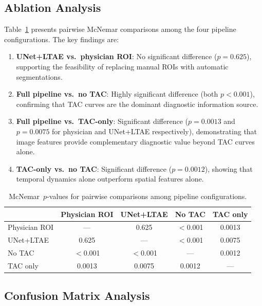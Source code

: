 \documentclass[sn-basic]{sn-jnl}
\begin{document}
\subsection{Ablation Analysis}

Table~\ref{tab:mcnemar} presents pairwise McNemar comparisons
among the four pipeline configurations.  The key findings
are:

\begin{enumerate}
  \item \textbf{UNet+LTAE vs.\ physician ROI}: No significant
    difference ($p=0.625$), supporting the feasibility of
    replacing manual ROIs with automatic segmentations.
  \item \textbf{Full pipeline vs.\ no TAC}: Highly significant
    difference (both $p<0.001$), confirming that TAC curves
    are the dominant diagnostic information source.
  \item \textbf{Full pipeline vs.\ TAC-only}: Significant
    difference ($p=0.0013$ and $p=0.0075$ for physician and
    UNet+LTAE respectively), demonstrating that image
    features provide complementary diagnostic value beyond
    TAC curves alone.
  \item \textbf{TAC-only vs.\ no TAC}: Significant difference
    ($p=0.0012$), showing that temporal dynamics alone
    outperform spatial features alone.
\end{enumerate}

\begin{table}[t]
  \centering
  \caption{McNemar~$p$-values for pairwise comparisons among
    pipeline configurations.}
  \label{tab:mcnemar}
  \small
  \begin{threeparttable}
    \begin{tabular}{lcccc}
      \toprule
      & Physician ROI & UNet+LTAE & No TAC & TAC only \\
      \midrule
      Physician ROI & --- & 0.625 & $<$0.001 & 0.0013 \\
      UNet+LTAE & 0.625 & --- & $<$0.001 & 0.0075 \\
      No TAC & $<$0.001 & $<$0.001 & --- & 0.0012 \\
      TAC only & 0.0013 & 0.0075 & 0.0012 & --- \\
      \bottomrule
    \end{tabular}
  \end{threeparttable}
\end{table}

\subsection{Confusion Matrix Analysis}
\end{document}
